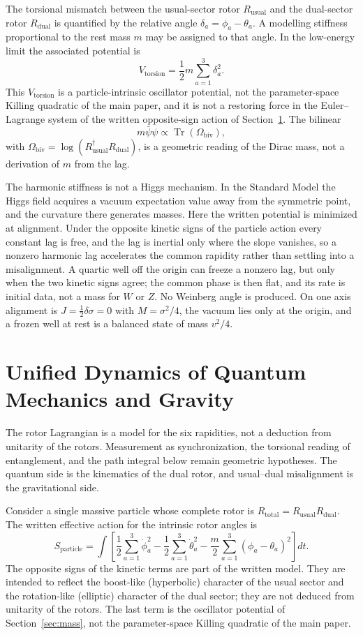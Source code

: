 \documentclass[a4paper]{article}
\begin{document}
The torsional mismatch between the usual-sector rotor $R_\text{usual}$ and the dual-sector rotor $R_\text{dual}$ is quantified by the relative angle $\delta_a = \phi_a - \theta_a$. A modelling stiffness proportional to the rest mass $m$ may be assigned to that angle. In the low-energy limit the associated potential is
\[
V_\text{torsion} = \frac{1}{2} m \sum_{a=1}^3 \delta_a^2.
\]
This $V_{\mathrm{torsion}}$ is a particle-intrinsic oscillator potential, not the parameter-space Killing quadratic of the main paper, and it is not a restoring force in the Euler--Lagrange system of the written opposite-sign action of Section~\ref{sec:dynamics}. The bilinear
\[
m \bar{\psi}\psi \propto \operatorname{Tr}(\Omega_\text{biv}),
\]
with $\Omega_\text{biv} = \log(R_\text{usual}^\dagger R_\text{dual})$, is a geometric reading of the Dirac mass, not a derivation of $m$ from the lag.

The harmonic stiffness is not a Higgs mechanism. In the Standard Model the Higgs field acquires a vacuum expectation value away from the symmetric point, and the curvature there generates masses. Here the written potential is minimized at alignment. Under the opposite kinetic signs of the particle action every constant lag is free, and the lag is inertial only where the slope vanishes, so a nonzero harmonic lag accelerates the common rapidity rather than settling into a misalignment. A quartic well off the origin can freeze a nonzero lag, but only when the two kinetic signs agree; the common phase is then flat, and its rate is initial data, not a mass for \(W\) or \(Z\). No Weinberg angle is produced. On one axis alignment is \(J=\frac12\delta\sigma=0\) with \(M=\sigma^2/4\), the vacuum lies only at the origin, and a frozen well at rest is a balanced state of mass \(v^2/4\).

\section{Unified Dynamics of Quantum Mechanics and Gravity}
\label{sec:dynamics}

The rotor Lagrangian is a model for the six rapidities, not a deduction from unitarity of the rotors. Measurement as synchronization, the torsional reading of entanglement, and the path integral below remain geometric hypotheses. The quantum side is the kinematics of the dual rotor, and usual--dual misalignment is the gravitational side.

Consider a single massive particle whose complete rotor is $R_\text{total} = R_\text{usual} R_\text{dual}$. The written effective action for the intrinsic rotor angles is
\[
S_\text{particle} = \int \left[ \frac{1}{2} \sum_{a=1}^3 \dot{\phi}_a^2 - \frac{1}{2} \sum_{a=1}^3 \dot{\theta}_a^2 - \frac{m}{2} \sum_{a=1}^3 (\phi_a - \theta_a)^2 \right] dt.
\]
The opposite signs of the kinetic terms are part of the written model. They are intended to reflect the boost-like (hyperbolic) character of the usual sector and the rotation-like (elliptic) character of the dual sector; they are not deduced from unitarity of the rotors. The last term is the oscillator potential of Section~\ref{sec:mass}, not the parameter-space Killing quadratic of the main paper.
\end{document}
